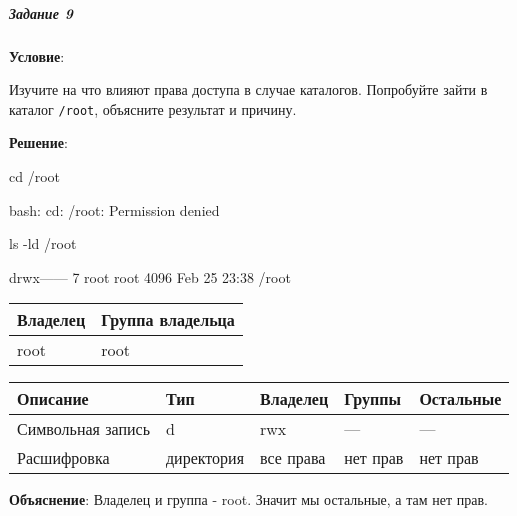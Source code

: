 \subparagraph{Задание 9} \textbf{Условие}:

Изучите на что влияют права доступа в случае каталогов. Попробуйте зайти в каталог \verb|/root|, объясните результат и причину.

\textbf{Решение}:

\begin{BashBox}
    cd /root
\end{BashBox}

\begin{OutBox}
    bash: cd: /root: Permission denied
\end{OutBox}

\begin{BashBox}
    ls -ld /root
\end{BashBox}

\begin{OutBox}
    drwx------ 7 root root 4096 Feb 25 23:38 /root
\end{OutBox}

\begin{table}[h!]
    \centering
    \begin{tabular}{ | l | l | }
        \hline
        Владелец    & Группа владельца  \\ \hline
        \hline
        root 	    & root              \\ \hline
    \end{tabular}
\end{table}

\begin{table}[h!]
    \centering
    \begin{tabular}{ | l | l | l | l | l | }
        \hline
        Описание            & Тип           & Владелец  & Группы    & Остальные \\ \hline
        \hline
        Символьная запись 	& d             & rwx 	    & --- 	    & ---       \\ \hline
        Расшифровка 	    & директория    & все права & нет прав  & нет прав  \\ \hline
    \end{tabular}
\end{table}

\textbf{Объяснение}: Владелец и группа - root. Значит мы остальные, а там нет прав.
